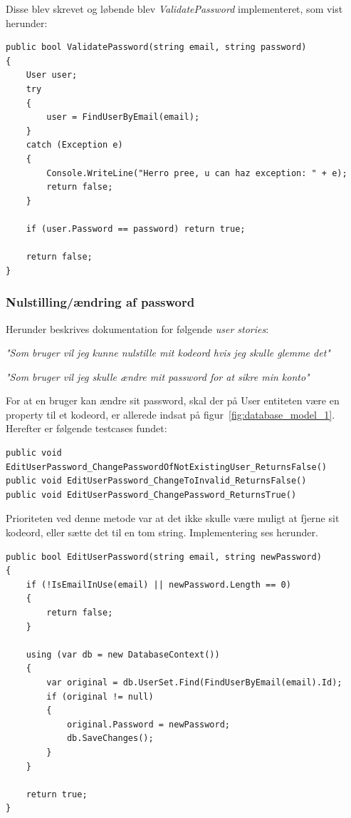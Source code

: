 Disse blev skrevet og løbende blev \textit{ValidatePassword} implementeret, som vist herunder:

\begin{lstlisting}[caption=ValidatePassword metoden]
public bool ValidatePassword(string email, string password)
{
	User user;
	try
	{
		user = FindUserByEmail(email);
	}
	catch (Exception e)
	{
		Console.WriteLine("Herro pree, u can haz exception: " + e);
		return false;
	}
	
	if (user.Password == password) return true;
	
	return false;
}
\end{lstlisting}

\subsubsection{Nulstilling/ændring af password}
Herunder beskrives dokumentation for følgende \textit{user stories}:

\textit{"Som bruger vil jeg kunne nulstille mit kodeord hvis jeg skulle glemme det"}

\textit{"Som bruger vil jeg skulle ændre mit password for at sikre min konto"}

For at en bruger kan ændre sit password, skal der på User entiteten være en property til et kodeord, er allerede indsat på figur~\ref{fig:database_model_1}. Herefter er følgende testcases fundet: 

\begin{lstlisting}[caption=Testcases til EditUserPassword metoden]
public void EditUserPassword_ChangePasswordOfNotExistingUser_ReturnsFalse()
public void EditUserPassword_ChangeToInvalid_ReturnsFalse()
public void EditUserPassword_ChangePassword_ReturnsTrue()
\end{lstlisting}

Prioriteten ved denne metode var at det ikke skulle være muligt at fjerne sit kodeord, eller sætte det til en tom string. Implementering ses herunder.

\begin{lstlisting}[caption=EditUserPassword metoden]
public bool EditUserPassword(string email, string newPassword)
{
	if (!IsEmailInUse(email) || newPassword.Length == 0)
	{
		return false;
	}
	
	using (var db = new DatabaseContext())
	{
		var original = db.UserSet.Find(FindUserByEmail(email).Id);
		if (original != null)
		{
			original.Password = newPassword;
			db.SaveChanges();
		}
	}
	
	return true;
}
\end{lstlisting}

